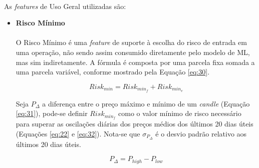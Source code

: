 \paragraph{} As \textit{features} de Uso Geral utilizadas são:

\begin{itemize}

    \item \textbf{Risco Mínimo} \\ \\
    O Risco Mínimo é uma \textit{feature} de suporte à escolha do risco de entrada em uma operação, não sendo assim consumido diretamente pelo modelo de ML, mas sim indiretamente. A fórmula é composta por uma parcela fixa somada a uma parcela variável, conforme mostrado pela Equação \ref{eq:30}.

    \begin{equation} \label{eq:30}
        Risk_{min} = Risk_{min_f} + Risk_{min_v}
    \end{equation}

    Seja \begin{math} P_{\Delta} \end{math} a diferença entre o preço máximo e mínimo de um \textit{candle} (Equação \ref{eq:31}), pode-se definir \begin{math} Risk_{min_f} \end{math} como o valor mínimo de risco necessário para superar as oscilações diárias dos preços médios dos últimos 20 dias úteis (Equações \ref{eq:22} e \ref{eq:32}). Nota-se que \begin{math} \sigma_{P_{\Delta}} \end{math} é o desvio padrão relativo aos últimos 20 dias úteis.

    \begin{equation} \label{eq:31}
        P_{\Delta} = P_{high} - P_{low}
    \end{equation}


\end{itemize}
